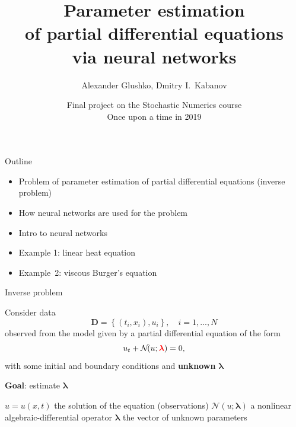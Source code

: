 \documentclass{beamer}
\title{Parameter estimation\\of partial differential equations\\via neural networks}
\author{Alexander Glushko, Dmitry I.\ Kabanov}
\date{Final project on the Stochastic Numerics course\\Once upon a time in 2019}
\def\\{}%
\renewcommand{\vec}[1]{\boldsymbol{#1}}
\newcommand{\VLambda}{\ensuremath{\vec{\lambda}}}
\newcommand{\NonlinOp}{\mathcal N\!}
\begin{document}
\maketitle

\begin{frame}{Outline}
\begin{itemize}
    \item Problem of parameter estimation of partial differential equations
          (inverse problem)
    \item How neural networks are used for the problem
    \item Intro to neural networks
    \item Example 1: linear heat equation
    \item Example~2: viscous Burger's equation
\end{itemize}
\end{frame}

\begin{frame}{Inverse problem}

Consider data
\[
    \vec{D} = \left\{(t_i, x_i), u_i\right\}, \quad i = 1, ..., N
\]
observed from the
model given by a partial differential equation of the form
\begin{equation*}
    \label{eq:pde}
    u_t + \mathcal N\!(u; {\color{red}\VLambda}) = 0,
\end{equation*}
with some initial and boundary conditions and \textbf{unknown} {\color{red}$\VLambda$}

{
\vspace{0.5cm}
\centering
\textbf{Goal}: estimate {\color{red}$\VLambda$}\par
}

\vspace{1cm}
$u=u(x, t)$ the solution of the equation (observations)\\
$\NonlinOp(u; \VLambda)$ a nonlinear algebraic-differential operator \\
$\VLambda$ the vector of unknown parameters

\end{frame}
\end{document}
